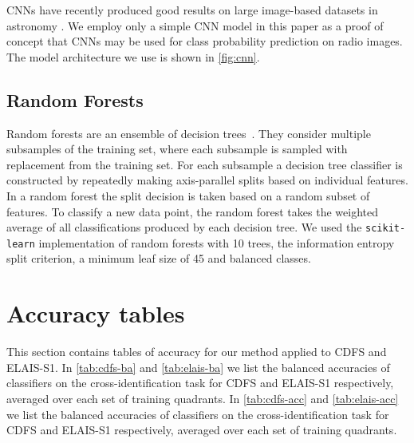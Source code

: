     CNNs have recently produced good results on large image-based datasets in
    astronomy \citep[e.g.]{lukic18compact, dieleman15cnn}. We employ
    only a simple CNN model in this paper as a proof of concept that CNNs may
    be used for class probability prediction on radio images. The model
    architecture we use is shown in \autoref{fig:cnn}.

  \subsection{Random Forests}
  \label{sec:random-forests}

    Random forests are an ensemble of decision
    trees~\citep{breiman01random-forest}. They consider multiple subsamples of
    the training set, where each subsample is sampled with replacement from
    the training set. For each subsample a decision tree classifier is
    constructed by repeatedly making axis-parallel splits based on individual
    features. In a random forest the split decision is taken based on a random
    subset of features. To classify a new data point, the random forest takes
    the weighted average of all classifications produced by each decision
    tree. {We used the \texttt{scikit-learn} \citep{pedregosa11sklearn}
    implementation of random forests with 10 trees, the information entropy
    split criterion, a minimum leaf size of 45 and balanced classes}.

\section{Accuracy tables}\label{app:accuracies}
  
  This section contains tables of accuracy for our method applied to CDFS and
  ELAIS-S1. In \autoref{tab:cdfs-ba} and \autoref{tab:elais-ba} we list the
  balanced accuracies of classifiers on the cross-identification task for CDFS
  and ELAIS-S1 respectively, averaged over each set of training quadrants. In
  \autoref{tab:cdfs-acc} and \autoref{tab:elais-acc} we list the balanced
  accuracies of classifiers on the cross-identification task for CDFS and
  ELAIS-S1 respectively, averaged over each set of training quadrants.

